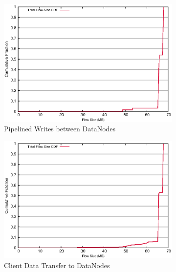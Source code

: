 \begin{figure}[!htpb]
\begin{subfigure}[b]{.45\linewidth}
	\includegraphics[width=.99\textwidth]{figures/6writes/36_44_type_flow_size.eps} 
	\caption{Pipelined Writes between DataNodes}\label{fig:write_size:pipe_write}
   \end{subfigure} %
  \begin{subfigure}[b]{.45\linewidth}
   \centering
	\includegraphics[width=.99\textwidth]{figures/6writes/32_36_type_flow_size.eps} 
	\caption{Client Data Transfer to DataNodes}\label{fig:write_size:client_write}
   \end{subfigure} \\%
  \begin{subfigure}[b]{.55\linewidth}
   \centering

\end{subfigure}
\end{figure}
